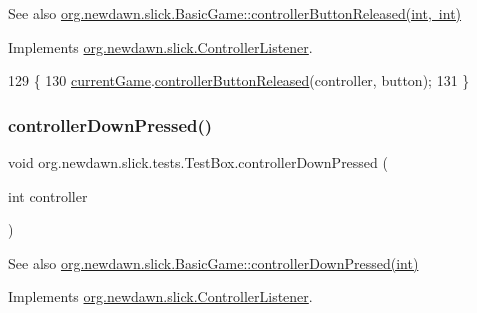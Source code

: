 \begin{DoxySeeAlso}{See also}
\mbox{\hyperlink{classorg_1_1newdawn_1_1slick_1_1_basic_game_ad979755eccbdc2959289f001b2c26bda}{org.\+newdawn.\+slick.\+Basic\+Game\+::controller\+Button\+Released(int, int)}} 
\end{DoxySeeAlso}


Implements \mbox{\hyperlink{interfaceorg_1_1newdawn_1_1slick_1_1_controller_listener_a34020453a6c40e12b149c334a4adc246}{org.\+newdawn.\+slick.\+Controller\+Listener}}.


\begin{DoxyCode}
129                                                                      \{
130         \mbox{\hyperlink{classorg_1_1newdawn_1_1slick_1_1tests_1_1_test_box_a5e0fdb2f97173d828af597044c525078}{currentGame}}.\mbox{\hyperlink{classorg_1_1newdawn_1_1slick_1_1_basic_game_ad979755eccbdc2959289f001b2c26bda}{controllerButtonReleased}}(controller, button);
131     \}
\end{DoxyCode}
\mbox{\label{classorg_1_1newdawn_1_1slick_1_1tests_1_1_test_box_aa84a23e65a7987d83d2b555dce79076d}} 
\subsubsection{\texorpdfstring{controller\+Down\+Pressed()}{controllerDownPressed()}}
{\footnotesize\ttfamily void org.\+newdawn.\+slick.\+tests.\+Test\+Box.\+controller\+Down\+Pressed (\begin{DoxyParamCaption}\item[{int}]{controller }\end{DoxyParamCaption})\hspace{0.3cm}{\ttfamily [inline]}}

\begin{DoxySeeAlso}{See also}
\mbox{\hyperlink{classorg_1_1newdawn_1_1slick_1_1_basic_game_af4db3e5b864b3ee179de6935184727ac}{org.\+newdawn.\+slick.\+Basic\+Game\+::controller\+Down\+Pressed(int)}} 
\end{DoxySeeAlso}


Implements \mbox{\hyperlink{interfaceorg_1_1newdawn_1_1slick_1_1_controller_listener_a9c619e7cb29b3c8b68bc24f9a4e238d7}{org.\+newdawn.\+slick.\+Controller\+Listener}}.


